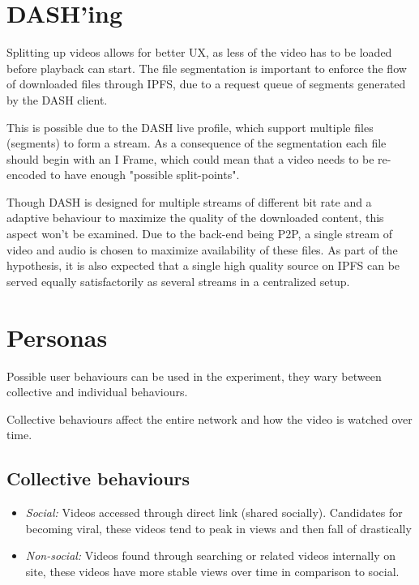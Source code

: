 \section{DASH'ing}
\label{sec:des-dash}
Splitting up videos allows for better \ac{UX}, as less of the video has to be loaded before playback can start. The file segmentation is important to enforce the flow of downloaded files through IPFS, due to a request queue of segments generated by the \ac{DASH} client.

This is possible due to the \ac{DASH} live profile, which support multiple files (segments) to form a stream. As a consequence of the segmentation each file should begin with an I Frame, which could mean that a video needs to be re-encoded to have enough "possible split-points".

Though \ac{DASH} is designed for multiple streams of different bit rate and a adaptive behaviour to maximize the quality of the downloaded content, this aspect won't be examined. Due to the back-end being \ac{P2P}, a single stream of video and audio is chosen to maximize availability of these files. As part of the hypothesis, it is also expected that a single high quality source on \ac{IPFS} can be served equally satisfactorily as several streams in a centralized setup.


\section{Personas}
\label{sec:des-persona}
Possible user behaviours can be used in the experiment, they wary between collective and individual behaviours.

Collective behaviours affect the entire network and how the video is watched over time.
\subsection{Collective behaviours}
\begin{itemize}
    \item \textit{Social:}
    Videos accessed through direct link (shared socially). Candidates for becoming viral, these videos tend to peak in views and then fall of drastically
    \item \textit{Non-social:}
    Videos found through searching or related videos internally on site, these videos have more stable views over time in comparison to social.
\end{itemize}

